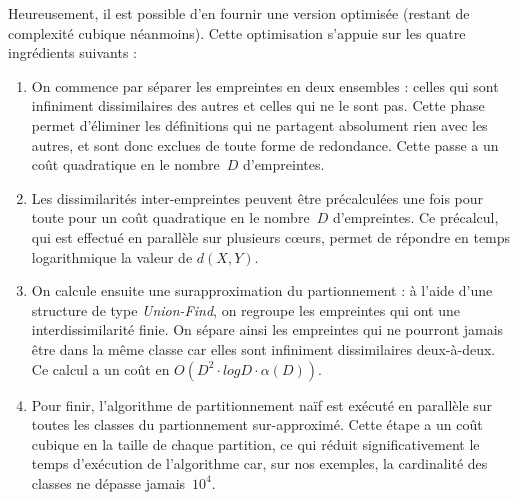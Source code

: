 Heureusement, il est possible d'en fournir une version optimisée
(restant de complexité cubique néanmoins). Cette optimisation
s'appuie sur les quatre ingrédients suivants :

\begin{enumerate}
\item
  On commence par séparer les empreintes en deux ensembles : celles
  qui sont infiniment dissimilaires des autres et celles qui ne le
  sont pas. Cette phase permet d'éliminer les définitions qui ne
  partagent absolument rien avec les autres, et sont donc exclues de
  toute forme de redondance. Cette passe a un coût quadratique en le
  nombre~$D$ d'empreintes.
\item
  Les dissimilarités inter-empreintes peuvent être précalculées une
  fois pour toute pour un coût quadratique en le nombre~$D$
  d'empreintes.  Ce précalcul, qui est effectué en parallèle sur
  plusieurs c{\oe}urs, permet de répondre en temps logarithmique
  la valeur de $d(X, Y)$.
\item
  On calcule ensuite une surapproximation du partionnement : à l'aide
  d'une structure de type \textit{Union-Find}, on regroupe les
  empreintes qui ont une interdissimilarité finie. On sépare ainsi
  les empreintes qui ne pourront jamais être dans la même classe car
  elles sont infiniment dissimilaires deux-à-deux. Ce calcul a un coût
  en $O(D^2 \cdot log D \cdot \alpha(D))$. 
\item
  Pour finir, l'algorithme de partitionnement naïf est exécuté en
  parallèle sur toutes les classes du partionnement sur-approximé.
  Cette étape a un coût cubique en la taille de chaque partition, ce
  qui réduit significativement le temps d'exécution de l'algorithme
  car, sur nos exemples, la cardinalité des classes ne dépasse
  jamais~$10^4$.

\end{enumerate}
